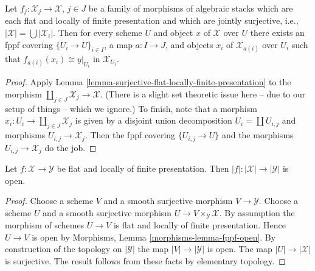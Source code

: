 \begin{lemma}
\label{lemma-surjective-family-flat-locally-finite-presentation}
Let $f_j : \mathcal{X}_j \to \mathcal{X}$, $j \in J$ be a family of morphisms
of algebraic stacks which are each flat and locally of finite presentation
and which are jointly surjective, i.e.,
$|\mathcal{X}| = \bigcup |\mathcal{X}_i|$.
Then for every scheme $U$ and object $x$ of $\mathcal{X}$ over $U$
there exists an fppf covering $\{U_i \to U\}_{i \in I}$, a map
$a : I \to J$, and objects $x_i$ of $\mathcal{X}_{a(i)}$ over $U_i$
such that $f_{a(i)}(x_i) \cong y|_{U_i}$ in $\mathcal{X}_{U_i}$.
\end{lemma}

\begin{proof}
Apply
Lemma \ref{lemma-surjective-flat-locally-finite-presentation}
to the morphism $\coprod_{j \in J} \mathcal{X}_j \to \mathcal{X}$.
(There is a slight set theoretic issue here -- due to our setup of
things -- which we ignore.) To finish, note that a morphism
$x_i : U_i \to \coprod_{j \in J} \mathcal{X}_j$ is given by a
disjoint union decomposition $U_i = \coprod U_{i, j}$ and morphisms
$U_{i, j} \to \mathcal{X}_j$. Then the fppf covering $\{U_{i, j} \to U\}$
and the morphisms $U_{i, j} \to \mathcal{X}_j$ do the job.
\end{proof}

\begin{lemma}
\label{lemma-fppf-open}
Let $f : \mathcal{X} \to \mathcal{Y}$ be flat and locally of finite
presentation. Then $|f| : |\mathcal{X}| \to |\mathcal{Y}|$ is open.
\end{lemma}

\begin{proof}
Choose a scheme $V$ and a smooth surjective morphism $V \to \mathcal{Y}$.
Choose a scheme $U$ and a smooth surjective morphism
$U \to V \times_\mathcal{Y} \mathcal{X}$. By assumption the morphism
of schemes $U \to V$ is flat and locally of finite presentation.
Hence $U \to V$ is open by
Morphisms, Lemma \ref{morphisms-lemma-fppf-open}.
By construction of the topology on $|\mathcal{Y}|$ the map
$|V| \to |\mathcal{Y}|$ is open.
The map $|U| \to |\mathcal{X}|$ is surjective.
The result follows from these facts by elementary topology.
\end{proof}















